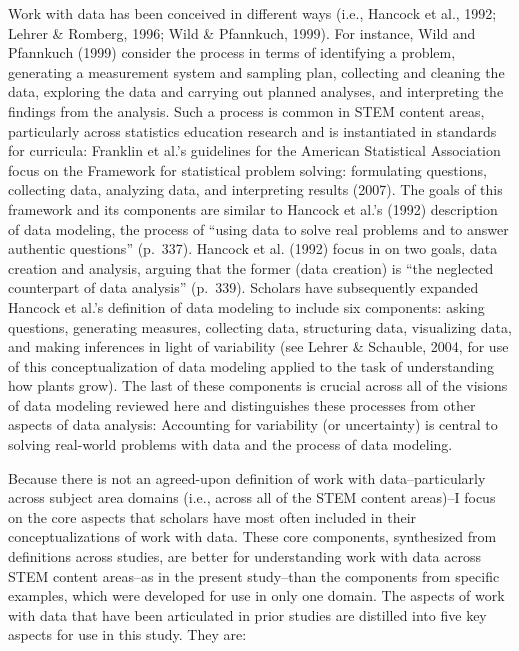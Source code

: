 \documentclass[]{msu-thesis}
\theoremstyle{definition}
\theoremstyle{definition}
\theoremstyle{definition}
\theoremstyle{remark}
\begin{document}
Work with data has been conceived in different ways (i.e., Hancock et
al., 1992; Lehrer \& Romberg, 1996; Wild \& Pfannkuch, 1999). For
instance, Wild and Pfannkuch (1999) consider the process in terms of
identifying a problem, generating a measurement system and sampling
plan, collecting and cleaning the data, exploring the data and carrying
out planned analyses, and interpreting the findings from the analysis.
Such a process is common in STEM content areas, particularly across
statistics education research and is instantiated in standards for
curricula: Franklin et al.'s guidelines for the American Statistical
Association focus on the Framework for statistical problem solving:
formulating questions, collecting data, analyzing data, and interpreting
results (2007). The goals of this framework and its components are
similar to Hancock et al.'s (1992) description of data modeling, the
process of ``using data to solve real problems and to answer authentic
questions'' (p.~337). Hancock et al. (1992) focus in on two goals, data
creation and analysis, arguing that the former (data creation) is ``the
neglected counterpart of data analysis'' (p.~339). Scholars have
subsequently expanded Hancock et al.'s definition of data modeling to
include six components: asking questions, generating measures,
collecting data, structuring data, visualizing data, and making
inferences in light of variability (see Lehrer \& Schauble, 2004, for
use of this conceptualization of data modeling applied to the task of
understanding how plants grow). The last of these components is crucial
across all of the visions of data modeling reviewed here and
distinguishes these processes from other aspects of data analysis:
Accounting for variability (or uncertainty) is central to solving
real-world problems with data and the process of data modeling.

Because there is not an agreed-upon definition of work with
data--particularly across subject area domains (i.e., across all of the
STEM content areas)--I focus on the core aspects that scholars have most
often included in their conceptualizations of work with data. These core
components, synthesized from definitions across studies, are better for
understanding work with data across STEM content areas--as in the
present study--than the components from specific examples, which were
developed for use in only one domain. The aspects of work with data that
have been articulated in prior studies are distilled into five key
aspects for use in this study. They are:
\end{document}
